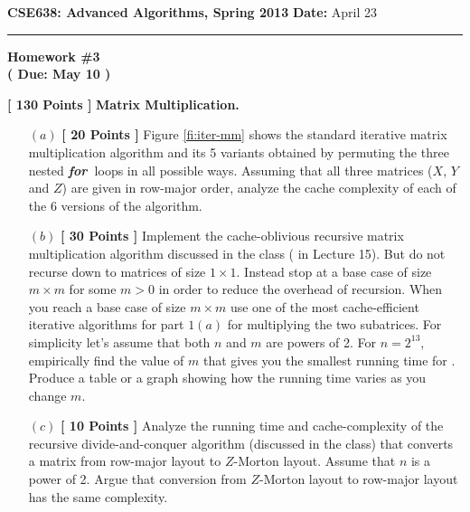 \documentclass[11pt]{article}
\newcommand{\xfor}{{\bf{\em{for~}}}}
\def\func#1{\mbox{\textrm{\bf{\sc{#1}}}}}
\def\para#1{\vspace{0.2cm}\noindent{\bf{#1.}}}
\newcommand{\headings}[3]{
{\large
{\bf CSE638: Advanced Algorithms, Spring 2013} \hfill {{\bf Date:} #1}\vspace{-0.1cm}\\
\rule[0.01in]{\textwidth}{0.025in}}
\begin{center} \vspace{-0.2cm}
{{\bf\huge{Homework \##2}}\\{\bf( Due: #3 )}} \end{center}
}
\begin{document}
\headings{April 23}{3}{May 10}
\newcommand{\lecnum}{5}  %



\vspace{-0.5cm}
\para{Task 1} {\bf{[ 130 Points ]}} {\bf Matrix Multiplication.}
%
 \begin{itemize}

\vspace{-0.2cm}
 \item[$(a)$] {\bf{[ 20 Points ]}} Figure \ref{fi:iter-mm} shows the
 standard iterative matrix multiplication algorithm and its 5 variants
 obtained by permuting the three nested \xfor loops in all possible ways.
 Assuming that all three matrices ($X$, $Y$ and $Z$) are given in row-major
 order, analyze the cache complexity of each of the 6 versions of the
 algorithm. 

\vspace{-0.2cm}
 \item[$(b)$] {\bf{[ 30 Points ]}} Implement the cache-oblivious recursive
 matrix multiplication algorithm discussed in the class (\func{Rec-MM}
 in Lecture 15). But do not recurse down to matrices of size $1 \times 1$.
 Instead stop at a base case of size $m \times m$ for some $m > 0$ in order
 to reduce the overhead of recursion. When you reach a base case
 of size $m \times m$ use one of the most cache-efficient
 iterative algorithms for part $1(a)$ for multiplying the
 two subatrices. For simplicity let's assume that
 both $n$ and $m$ are powers of 2. For $n = 2^{13}$, empirically
 find the value of $m$ that gives you the smallest running
 time for \func{Rec-MM}. Produce a table or a graph showing
 how the running time varies as you change $m$.

\vspace{-0.2cm}
 \item[$(c)$] {\bf{[ 10 Points ]}} Analyze the running time and
 cache-complexity of the recursive divide-and-conquer algorithm
 (discussed in the class) that converts a matrix from row-major 
 layout to $Z$-Morton layout. Assume that $n$ is a power of 2.
 Argue that conversion from $Z$-Morton layout to row-major layout 
 has the same complexity.


\end{itemize}
\end{document}

